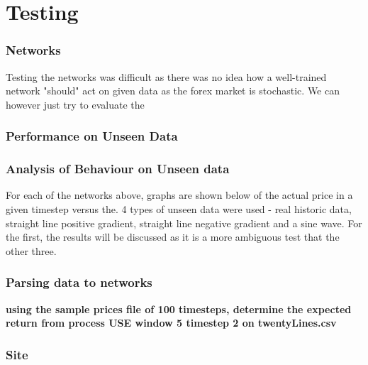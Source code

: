 \newpage
\part{Testing}  
    \section{Networks}
        Testing the networks was difficult as there was no idea how a well-trained network "should" act on given data as the forex market is stochastic. We can however just try to evaluate the 
        \section{Performance on Unseen Data}
        \section{Analysis of Behaviour on Unseen data}
        For each of the networks above, graphs are shown below of the actual price in a given timestep versus the. 4 types of unseen data were used - real historic data, straight line positive gradient, straight line negative gradient and a sine wave. For the first, the results will be discussed as it is a more ambiguous test that the other three. 

        \section{Parsing data to networks}
        \textbf{using the sample prices file of 100 timesteps, determine the expected return from process USE window 5 timestep 2 on twentyLines.csv }
    \section{Site}